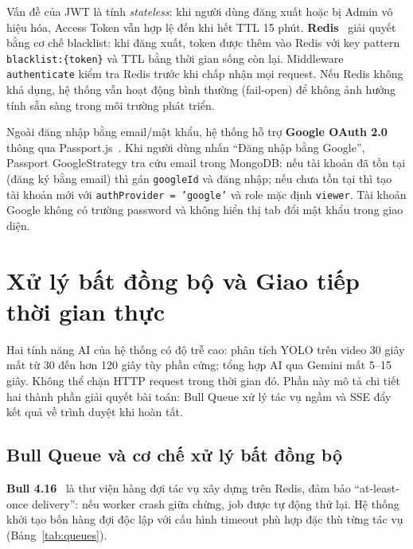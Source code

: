 \documentclass[../DoAn.tex]{subfiles}
\begin{document}
Vấn đề của JWT là tính \textit{stateless}: khi người dùng đăng xuất hoặc bị Admin vô hiệu hóa, Access Token vẫn hợp lệ đến khi hết TTL 15 phút. \textbf{Redis}~\cite{redis} giải quyết bằng cơ chế blacklist: khi đăng xuất, token được thêm vào Redis với key pattern \texttt{blacklist:\{token\}} và TTL bằng thời gian sống còn lại. Middleware \texttt{authenticate} kiểm tra Redis trước khi chấp nhận mọi request. Nếu Redis không khả dụng, hệ thống vẫn hoạt động bình thường (fail-open) để không ảnh hưởng tính sẵn sàng trong môi trường phát triển.

Ngoài đăng nhập bằng email/mật khẩu, hệ thống hỗ trợ \textbf{Google OAuth 2.0}~\cite{googleoauth} thông qua Passport.js~\cite{passportjs}. Khi người dùng nhấn ``Đăng nhập bằng Google'', Passport GoogleStrategy tra cứu email trong MongoDB: nếu tài khoản đã tồn tại (đăng ký bằng email) thì gán \texttt{googleId} và đăng nhập; nếu chưa tồn tại thì tạo tài khoản mới với \texttt{authProvider = 'google'} và role mặc định \texttt{viewer}. Tài khoản Google không có trường password và không hiển thị tab đổi mật khẩu trong giao diện.

\section{Xử lý bất đồng bộ và Giao tiếp thời gian thực}
\label{section:3.3}

Hai tính năng AI của hệ thống có độ trễ cao: phân tích YOLO trên video 30 giây mất từ 30 đến hơn 120 giây tùy phần cứng; tổng hợp AI qua Gemini mất 5--15 giây. Không thể chặn HTTP request trong thời gian đó. Phần này mô tả chi tiết hai thành phần giải quyết bài toán: Bull Queue xử lý tác vụ ngầm và SSE đẩy kết quả về trình duyệt khi hoàn tất.

\subsection{Bull Queue và cơ chế xử lý bất đồng bộ}

\textbf{Bull 4.16}~\cite{bullqueue} là thư viện hàng đợi tác vụ xây dựng trên Redis, đảm bảo ``at-least-once delivery'': nếu worker crash giữa chừng, job được tự động thử lại. Hệ thống khởi tạo bốn hàng đợi độc lập với cấu hình timeout phù hợp đặc thù từng tác vụ (Bảng~\ref{tab:queues}).
\end{document}
